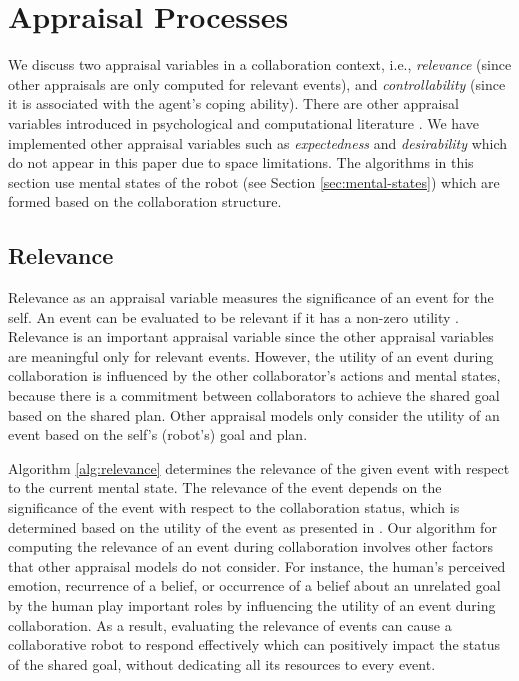 \documentclass{sig-alternate-05-2015}
\begin{document}
\section{Appraisal Processes}

We discuss two appraisal variables in a collaboration context, i.e.,
\textit{relevance} (since other appraisals are only computed for relevant
events), and \textit{controllability} (since it is associated with the agent's
coping ability). There are other appraisal variables introduced in psychological
\cite{scherer:appraisal-processes} and computational literature
\cite{gratch:domain-independent}. We have implemented other appraisal variables
such as \textit{expectedness} \cite{shayganfar:appraisal-short} and
\textit{desirability} \cite{shayganfar:emotional-awareness} which do not appear
in this paper due to space limitations. The algorithms in this section use
mental states of the robot (see Section \ref{sec:mental-states}) which are
formed based on the collaboration structure.

\subsection{Relevance}

Relevance as an appraisal variable measures the significance of an event for the
self. An event can be evaluated to be relevant if it has a non-zero utility
\cite{marsella:ema-process-model}. Relevance is an important appraisal variable
since the other appraisal variables are meaningful only for relevant events.
However, the utility of an event during collaboration is influenced by the other
collaborator's actions and mental states, because there is a commitment between
collaborators to achieve the shared goal based on the shared plan. Other
appraisal models only consider the utility of an event based on the self's
(robot's) goal and plan.

Algorithm \ref{alg:relevance} determines the relevance of the given event with
respect to the current mental state. The relevance of the event depends on the
significance of the event with respect to the collaboration status, which is
determined based on the utility of the event as presented in
\cite{gratch:domain-independent,marsella:ema-process-model}. Our algorithm for
computing the relevance of an event during collaboration involves other factors
that other appraisal models do not consider. For instance, the human's
perceived emotion, recurrence of a belief, or occurrence of a belief about an
unrelated goal by the human play important roles by influencing the utility
of an event during collaboration. As a result, evaluating the relevance of
events can cause a collaborative robot to respond effectively which can
positively impact the status of the shared goal, without dedicating all its
resources to every event.
\end{document}
